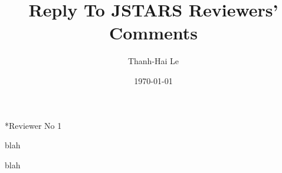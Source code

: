 \documentclass{article}
\title{Reply To JSTARS Reviewers' Comments}
\date{\today}
\author{Thanh-Hai Le}
\newcommand{\replyToComment}[2]{
\vspace{2mm}
\begin{description}
    [
      align=left,
      style=nextline,
      leftmargin=*,
      labelsep=\parindent,
      font=\normalfont
    ]
    \item[\textit{Comment:}]  {#1} 
    \item[\textit{Reply:}] {#2} 
\end{description} 
}
\begin{document}
\maketitle

\newenvironment{replyheader}{
	\vspace*{10mm}
\setcounter{page}{1}

\begin{tabular}{l l}
\bf{Name of Student:} & Le Thanh Hai \\
\bf{Degree:} & Doctor of Philosophy \\
\bf{Thesis Title:} & Scalar \& Homoskedastic Models \\ 
 & for SAR \& POLSAR data
\end{tabular}  
	\vspace*{10mm}
}

\subsection*{Reviewer No 1}

\replyToComment
    {blah}
    {blah}

%

%

%
\end{document}
